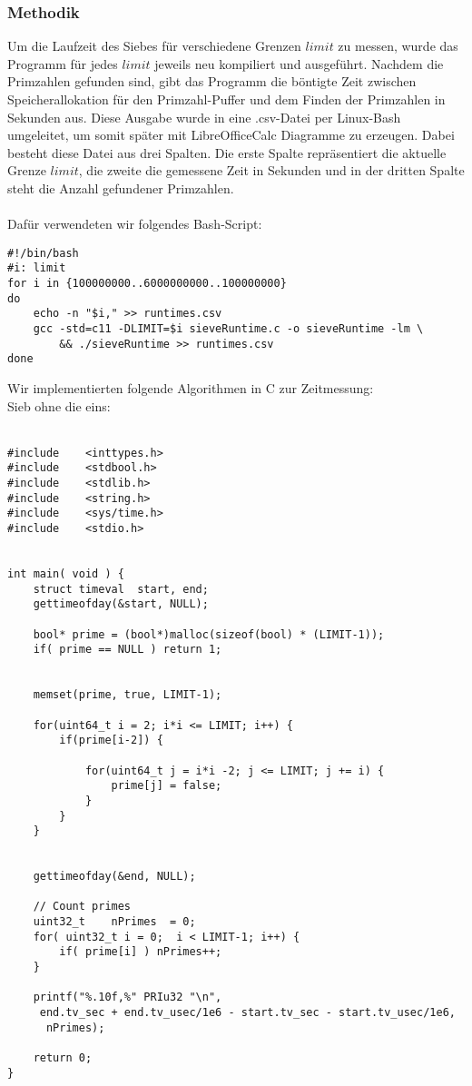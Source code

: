\documentclass[a4paper,12pt]{article}
\begin{document}
\subsubsection{Methodik}
Um die Laufzeit des Siebes für verschiedene Grenzen $limit$ zu messen, wurde das Programm für jedes $limit$ jeweils neu kompiliert und ausgeführt. Nachdem die Primzahlen gefunden sind, gibt das Programm die böntigte Zeit zwischen Speicherallokation für den Primzahl-Puffer und dem Finden der Primzahlen in Sekunden aus. Diese Ausgabe wurde in eine .csv-Datei per Linux-Bash umgeleitet, um somit später mit LibreOfficeCalc Diagramme zu erzeugen. Dabei besteht diese Datei aus drei Spalten. Die erste Spalte repräsentiert die aktuelle Grenze $limit$, die zweite die gemessene Zeit in Sekunden und in der dritten Spalte steht die Anzahl gefundener Primzahlen.
\\\\
Dafür verwendeten wir folgendes Bash-Script:

\begin{verbatim}
#!/bin/bash
#i: limit
for i in {100000000..6000000000..100000000}
do
    echo -n "$i," >> runtimes.csv
    gcc -std=c11 -DLIMIT=$i sieveRuntime.c -o sieveRuntime -lm \
		&& ./sieveRuntime >> runtimes.csv
done
\end{verbatim}

Wir implementierten folgende Algorithmen in C zur Zeitmessung:\\
Sieb ohne die eins:\\\\
\begin{verbatim}
#include    <inttypes.h>
#include    <stdbool.h>
#include    <stdlib.h>
#include    <string.h>
#include    <sys/time.h>
#include    <stdio.h>


int main( void ) {
    struct timeval  start, end;
    gettimeofday(&start, NULL);
    
    bool* prime = (bool*)malloc(sizeof(bool) * (LIMIT-1));
    if( prime == NULL ) return 1;


    memset(prime, true, LIMIT-1);

    for(uint64_t i = 2; i*i <= LIMIT; i++) {
        if(prime[i-2]) {

            for(uint64_t j = i*i -2; j <= LIMIT; j += i) {
                prime[j] = false;
            }
        }
	}


    gettimeofday(&end, NULL);
    
    // Count primes
    uint32_t    nPrimes  = 0;
    for( uint32_t i = 0;  i < LIMIT-1; i++) {
        if( prime[i] ) nPrimes++;
    }   
    
    printf("%.10f,%" PRIu32 "\n", 
	 end.tv_sec + end.tv_usec/1e6 - start.tv_sec - start.tv_usec/1e6, 
	  nPrimes);
    
	return 0;
}
\end{verbatim}
\end{document}
